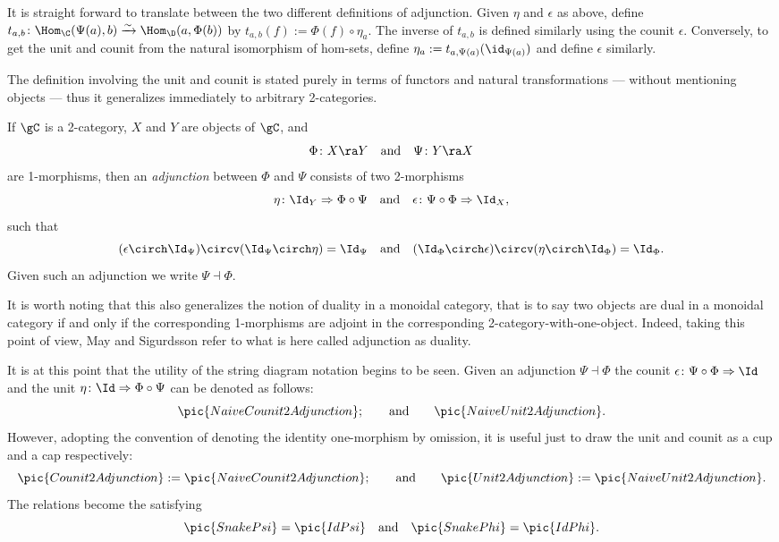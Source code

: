 It is straight forward to translate between the two different
definitions of adjunction.  Given $\eta$ and $\epsilon$ as above, define
$t_{a,b}\colon\Hom_\C(\Psi(a),b)\xrightarrow{\sim}
\Hom_\D(a,\Phi(b))$ by $t_{a,b}(f):=\Phi(f)\circ \eta_a$.  The inverse
of $t_{a,b}$ is defined similarly using the counit $\epsilon$.
Conversely, to get the unit and counit from the natural isomorphism of
hom-sets, define $\eta_a:=t_{a,\Psi(a)}(\id_{\Psi(a)})$ and define
$\epsilon$ similarly.

The definition involving the unit and counit is stated purely in terms
of functors and natural transformations --- without mentioning objects
--- thus it generalizes immediately to arbitrary 2-categories.

\begin{Definition}
If $\gC$ is a 2-category, $X$ and $Y$ are objects of $\gC$, and
\[ \Phi\colon X \ra Y\quad \text{and}\quad \Psi\colon Y \ra X \]
are 1-morphisms, then an \emph{adjunction} between $\Phi$ and $\Psi$
consists of two 2-morphisms
\[ \eta\colon \Id_Y \Rightarrow \Phi\circ\Psi \quad\text{and}\quad
\epsilon\colon \Psi\circ\Phi \Rightarrow \Id_X, \]
such that
\[(\epsilon\circh\Id_\Psi)\circv(\Id_\Psi\circh\eta)=\Id_\Psi
\quad\text{and}\quad(\Id_\Phi\circh\epsilon)\circv(\eta\circh\Id_\Phi)=\Id_\Phi.\]
Given such an adjunction we write $\Psi\dashv\Phi$.
\end{Definition}


It is worth noting that this also generalizes the notion of duality in
a monoidal category, that is to say two objects are dual in a monoidal
category if and only if the corresponding 1-morphisms are adjoint in
the corresponding 2-category-with-one-object.  Indeed, taking this
point of view, May and Sigurdsson \cite{MaySigurdsson} refer to what
is here called adjunction as duality.


It is at this point that the utility of the string diagram notation
begins to be seen.  Given an adjunction $\Psi\dashv\Phi$ the counit
$\epsilon \colon \Psi\circ \Phi \Rightarrow\Id$ and the unit
$\eta\colon \Id\Rightarrow\Phi\circ \Psi$ can be denoted as follows:
\[\pic{NaiveCounit2Adjunction};\qquad \text{and}\qquad
\pic{NaiveUnit2Adjunction}.\]
However, adopting the convention of denoting the identity one-morphism
by omission, it is useful just to draw the unit and counit as a cup
and a cap respectively:
\[\pic{Counit2Adjunction}:=\pic{NaiveCounit2Adjunction};\qquad
\text{and}\qquad \pic{Unit2Adjunction}:= \pic{NaiveUnit2Adjunction}.\]
The relations become the satisfying
\[\pic{SnakePsi}=\pic{IdPsi}\quad\text{and}\quad\pic{SnakePhi}=\pic{IdPhi}.\]


